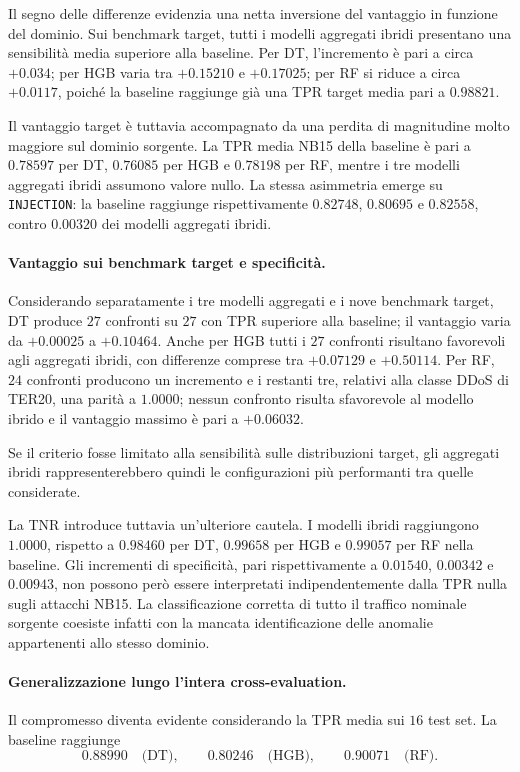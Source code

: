 Il segno delle differenze evidenzia una netta inversione del vantaggio in funzione del dominio. 
Sui benchmark target, tutti i modelli aggregati ibridi presentano una sensibilità media superiore alla baseline. 
Per DT, l'incremento è pari a circa $+0.034$; per HGB varia tra $+0.15210$ e $+0.17025$; per RF si riduce a circa $+0.0117$, poiché la baseline raggiunge già una TPR target media pari a $0.98821$.

Il vantaggio target è tuttavia accompagnato da una perdita di magnitudine molto maggiore sul dominio sorgente. 
La TPR media NB15 della baseline è pari a $0.78597$ per DT, $0.76085$ per HGB e $0.78198$ per RF, mentre i tre modelli aggregati ibridi assumono valore nullo. 
La stessa asimmetria emerge su \texttt{INJECTION}: la baseline raggiunge rispettivamente $0.82748$, $0.80695$ e $0.82558$, contro $0.00320$ dei modelli aggregati ibridi.

\paragraph{Vantaggio sui benchmark target e specificità.}
Considerando separatamente i tre modelli aggregati e i nove benchmark target, DT produce $27$ confronti su $27$ con TPR superiore alla baseline; il vantaggio varia da $+0.00025$ a $+0.10464$. 
Anche per HGB tutti i $27$ confronti risultano favorevoli agli aggregati ibridi, con differenze comprese tra $+0.07129$ e $+0.50114$. 
Per RF, $24$ confronti producono un incremento e i restanti tre, relativi alla classe DDoS di TER20, una parità a $1.0000$; nessun confronto risulta sfavorevole al modello ibrido e il vantaggio massimo è pari a $+0.06032$.

Se il criterio fosse limitato alla sensibilità sulle distribuzioni target, gli aggregati ibridi rappresenterebbero quindi le configurazioni più performanti tra quelle considerate.

La TNR introduce tuttavia un'ulteriore cautela. 
I modelli ibridi raggiungono $1.0000$, rispetto a $0.98460$ per DT, $0.99658$ per HGB e $0.99057$ per RF nella baseline. 
Gli incrementi di specificità, pari rispettivamente a $0.01540$, $0.00342$ e $0.00943$, non possono però essere interpretati indipendentemente dalla TPR nulla sugli attacchi NB15. 
La classificazione corretta di tutto il traffico nominale sorgente coesiste infatti con la mancata identificazione delle anomalie appartenenti allo stesso dominio.

\paragraph{Generalizzazione lungo l'intera cross-evaluation.}
Il compromesso diventa evidente considerando la TPR media sui $16$ test set.
La baseline raggiunge
\[
    0.88990 \quad \text{(DT)}, \qquad
    0.80246 \quad \text{(HGB)}, \qquad
    0.90071 \quad \text{(RF)}.
\]

